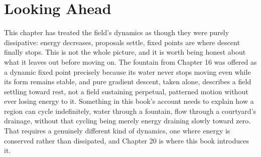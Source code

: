 \section{Looking Ahead}

This chapter has treated the field's dynamics as though they were purely dissipative: energy decreases, proposals settle, fixed points are where descent finally stops. This is not the whole picture, and it is worth being honest about what it leaves out before moving on. The fountain from Chapter 16 was offered as a dynamic fixed point precisely because its water never stops moving even while its form remains stable, and pure gradient descent, taken alone, describes a field settling toward rest, not a field sustaining perpetual, patterned motion without ever losing energy to it. Something in this book's account needs to explain how a region can cycle indefinitely, water through a fountain, flow through a courtyard's drainage, without that cycling being merely energy draining slowly toward zero. That requires a genuinely different kind of dynamics, one where energy is conserved rather than dissipated, and Chapter 20 is where this book introduces it.

